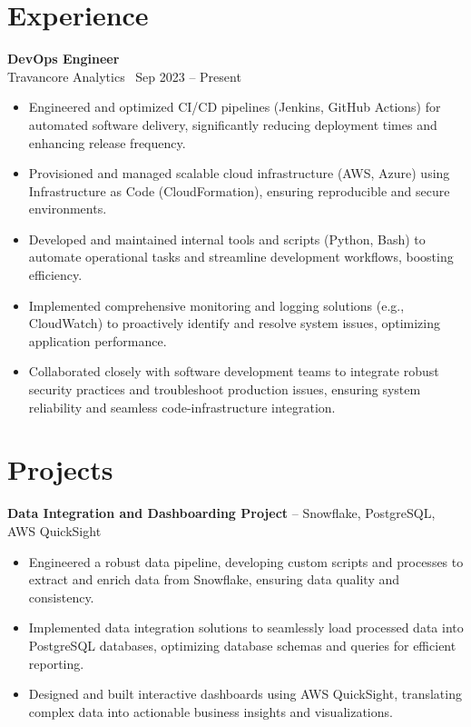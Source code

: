 \documentclass[a4paper,10pt]{article}
\begin{document}
\section*{Experience}
\textbf{DevOps Engineer} \\
Travancore Analytics \ \hfill Sep 2023 – Present
\begin{itemize}[leftmargin=0.5in, label=\textbullet]
    \item Engineered and optimized CI/CD pipelines (Jenkins, GitHub Actions) for automated software delivery, significantly reducing deployment times and enhancing release frequency.
    \item Provisioned and managed scalable cloud infrastructure (AWS, Azure) using Infrastructure as Code (CloudFormation), ensuring reproducible and secure environments.
    \item Developed and maintained internal tools and scripts (Python, Bash) to automate operational tasks and streamline development workflows, boosting efficiency.
    \item Implemented comprehensive monitoring and logging solutions (e.g., CloudWatch) to proactively identify and resolve system issues, optimizing application performance.
    \item Collaborated closely with software development teams to integrate robust security practices and troubleshoot production issues, ensuring system reliability and seamless code-infrastructure integration.
\end{itemize}


\section*{Projects}
	\textbf{Data Integration and Dashboarding Project} – Snowflake, PostgreSQL, AWS QuickSight
\begin{itemize}[leftmargin=0.25in, label=\textbullet]
    \item Engineered a robust data pipeline, developing custom scripts and processes to extract and enrich data from Snowflake, ensuring data quality and consistency.
    \item Implemented data integration solutions to seamlessly load processed data into PostgreSQL databases, optimizing database schemas and queries for efficient reporting.
    \item Designed and built interactive dashboards using AWS QuickSight, translating complex data into actionable business insights and visualizations.
\end{itemize}
\end{document}
